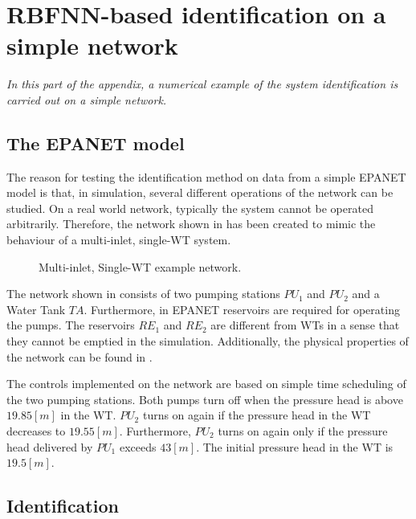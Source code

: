\chapter{RBFNN-based identification on a simple network}
\label{NN_based_example}

\emph{In this part of the appendix, a numerical example of the system identification is carried out on a simple network.}

\section{The EPANET model}
\label{example1_EPANET}

The reason for testing the identification method on data from a simple EPANET model is that, in simulation, several different operations of the network can be studied. On a real world network, typically the system cannot be operated arbitrarily. Therefore, the network shown in  has been created to mimic the behaviour of a multi-inlet, single-WT system. 

\begin{figure}[H]
\centering
 
\caption{Multi-inlet, Single-WT example network.}
\label{fig:epanet_example1_id}
\end{figure}
\vspace{-3mm}

The network shown in  consists of two pumping stations $PU_1$ and $PU_2$ and a Water Tank $TA$. Furthermore, in EPANET reservoirs are required for operating the pumps. The reservoirs $RE_1$ and $RE_2$ are different from WTs in a sense that they cannot be emptied in the simulation. Additionally, the physical properties of the network can be found in . 

The controls implemented on the network are based on simple time scheduling of the two pumping stations. Both pumps turn off when the pressure head is above $19.85 [m]$ in the WT. $PU_2$ turns on again if the pressure head in the WT decreases to $19.55 [m]$. Furthermore, $PU_2$ turns on again only if the pressure head delivered by $PU_1$ exceeds $43 [m]$. The initial pressure head in the WT is $19.5 [m]$.

\section{Identification}
\label{NN_based_example1} 


